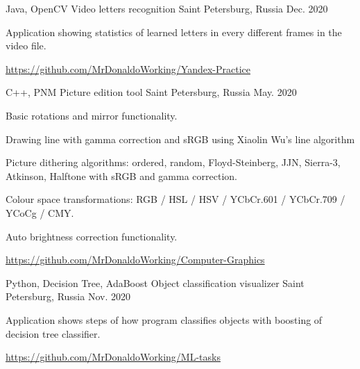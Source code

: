 \begin{cventries}
  \cventry
    {Java, OpenCV}%
    {Video letters recognition} %
    {Saint Petersburg, Russia} %
    {Dec. 2020} %
    {
      \begin{cvitems} %
        \item {Application showing statistics of learned letters in every different frames in the video file.}
        \item {\url{https://github.com/MrDonaldoWorking/Yandex-Practice}}
      \end{cvitems}
    }

  \cventry
    {C++, PNM}%
    {Picture edition tool} %
    {Saint Petersburg, Russia} %
    {May. 2020} %
    {
      \begin{cvitems} %
        \item {Basic rotations and mirror functionality.}
        \item {Drawing line with gamma correction and sRGB using Xiaolin Wu's line algorithm}
        \item {Picture dithering algorithms: ordered, random, Floyd-Steinberg, JJN, Sierra-3, Atkinson, Halftone with sRGB and gamma correction.}
        \item {Colour space transformations: RGB / HSL / HSV / YCbCr.601 / YCbCr.709 / YCoCg / CMY.}
        \item {Auto brightness correction functionality.}
        \item {\url{https://github.com/MrDonaldoWorking/Computer-Graphics}}
      \end{cvitems}
    }
    
  \cventry
    {Python, Decision Tree, AdaBoost}%
    {Object classification visualizer} %
    {Saint Petersburg, Russia} %
    {Nov. 2020} %
    {
      \begin{cvitems} %
        \item {Application shows steps of how program classifies objects with boosting of decision tree classifier.}
        \item {\url{https://github.com/MrDonaldoWorking/ML-tasks}}
      \end{cvitems}
    }


\end{cventries}
